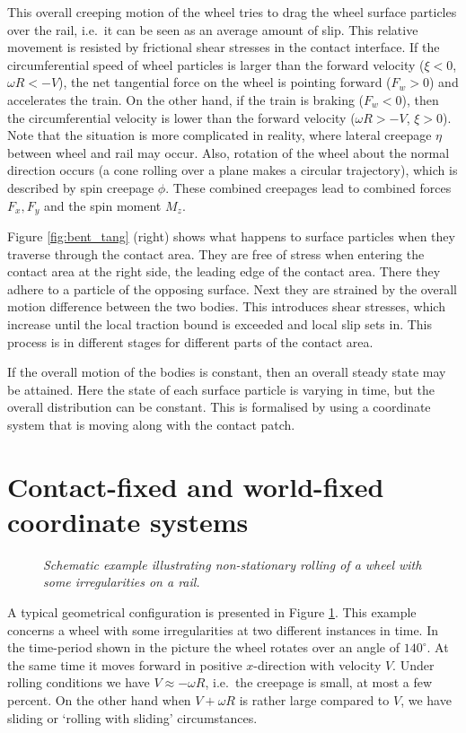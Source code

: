 \documentclass[12pt]{report}
\begin{document}
This overall creeping motion of the wheel tries to drag the wheel surface
particles over the rail, i.e.\ it can be seen as an average amount of slip.
This relative movement is resisted by frictional shear stresses in the
contact interface. If the circumferential speed of wheel particles is
larger than the forward velocity ($\xi<0$, $\omega R<-V$), the net
tangential force on the wheel is pointing forward ($F_w>0$) and accelerates
the train. On the other hand, if the train is braking ($F_w<0$), then the
circumferential velocity is lower than the forward velocity ($\omega R>-V$,
$\xi>0$). Note that the situation is more complicated in reality, where
lateral creepage $\eta$ between wheel and rail may occur. Also, rotation of
the wheel about the normal direction occurs (a cone rolling over a plane
makes a circular trajectory), which is described by spin creepage $\phi$.
These combined creepages lead to combined forces $F_x, F_y$ and the spin
moment $M_z$.

Figure \ref{fig:bent_tang} (right) shows what happens to surface particles
when they traverse through the contact area. They are free of stress when
entering the contact area at the right side, the leading edge of the
contact area. There they adhere to a particle of the opposing surface. Next
they are strained by the overall motion difference between the two bodies.
This introduces shear stresses, which increase until the local traction
bound is exceeded and local slip sets in. This process is in different
stages for different parts of the contact area.

If the overall motion of the bodies is constant, then an overall steady
state may be attained. Here the state of each surface particle is varying
in time, but the overall distribution can be constant. This is formalised
by using a coordinate system that is moving along with the contact patch.

\section{Contact-fixed and world-fixed coordinate systems}
\label{sec:coordsys}

\begin{figure}[bt]
\centering
{}
\caption{\em Schematic example illustrating non-stationary rolling of a
wheel with some irregularities on a rail.}
\label{fig:moving_coordsys}
\end{figure}

A typical geometrical configuration is presented in Figure
\ref{fig:moving_coordsys}. This example concerns a wheel with some
irregularities at two different instances in time. In the time-period shown
in the picture the wheel rotates over an angle of $140^\circ$. At the same
time it moves forward in positive $x$-direction with velocity $V$. Under
rolling conditions we have $V\approx -\omega R$, i.e.\ the creepage is
small, at most a few percent. On the other hand when $V+\omega R$ is
rather large compared to $V$, we have sliding or `rolling with sliding'
circumstances.
\end{document}
